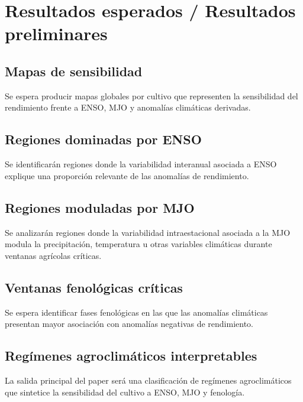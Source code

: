 \section{Resultados esperados / Resultados preliminares}

\subsection{Mapas de sensibilidad}

Se espera producir mapas globales por cultivo que representen la sensibilidad del rendimiento frente a ENSO, MJO y anomalías climáticas derivadas.


\subsection{Regiones dominadas por ENSO}

Se identificarán regiones donde la variabilidad interanual asociada a ENSO explique una proporción relevante de las anomalías de rendimiento.


\subsection{Regiones moduladas por MJO}

Se analizarán regiones donde la variabilidad intraestacional asociada a la MJO modula la precipitación, temperatura u otras variables climáticas durante ventanas agrícolas críticas.


\subsection{Ventanas fenológicas críticas}

Se espera identificar fases fenológicas en las que las anomalías climáticas presentan mayor asociación con anomalías negativas de rendimiento.


\subsection{Regímenes agroclimáticos interpretables}

La salida principal del paper será una clasificación de regímenes agroclimáticos que sintetice la sensibilidad del cultivo a ENSO, MJO y fenología.

